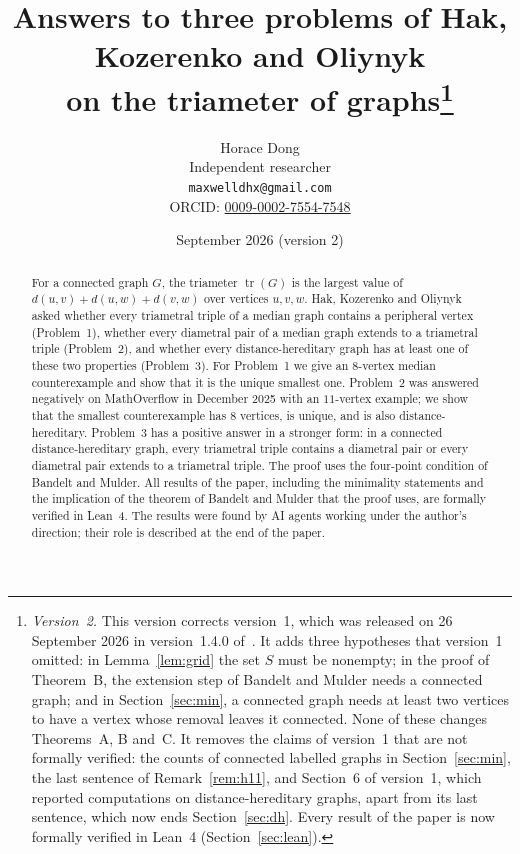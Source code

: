 \documentclass[11pt]{article}
\title{Answers to three problems of Hak, Kozerenko and Oliynyk\\ on the
triameter of graphs\thanks{\emph{Version~2.} This version corrects
version~1, which was released on 26 September 2026 in version~1.4.0
of~\cite{repo}. It adds three hypotheses that version~1 omitted: in
Lemma~\ref{lem:grid} the set $S$ must be nonempty; in the proof of
Theorem~B, the extension step of Bandelt and Mulder needs a connected graph;
and in Section~\ref{sec:min}, a connected graph needs at least two vertices to
have a vertex whose removal leaves it connected. None of these changes
Theorems~A, B and~C. It removes the claims of version~1 that are not formally
verified: the counts of connected labelled graphs in Section~\ref{sec:min},
the last sentence of Remark~\ref{rem:h11}, and Section~6 of version~1, which
reported computations on distance-hereditary graphs, apart from its last
sentence, which now ends Section~\ref{sec:dh}. Every result of the paper is
now formally verified in Lean~4 (Section~\ref{sec:lean}).}}
\author{Horace Dong\\ \small Independent researcher\\
\small\texttt{maxwelldhx@gmail.com}\\
\small ORCID: \href{https://orcid.org/0009-0002-7554-7548}{0009-0002-7554-7548}}
\date{September 2026 (version 2)}
\theoremstyle{remark}
\DeclareMathOperator{\tr}{tr}
\begin{document}
\maketitle
\begin{abstract}
For a connected graph $G$, the triameter $\tr(G)$ is the largest value of
$d(u,v)+d(u,w)+d(v,w)$ over vertices $u,v,w$. Hak, Kozerenko and Oliynyk asked
whether every triametral triple of a median graph contains a peripheral vertex
(Problem~1), whether every diametral pair of a median graph extends to a
triametral triple (Problem~2), and whether every distance-hereditary graph has
at least one of these two properties (Problem~3). For Problem~1 we give an
$8$-vertex median counterexample and show that it is the unique smallest
one. Problem~2 was answered negatively on MathOverflow in
December 2025 with an $11$-vertex example; we show that the smallest
counterexample has $8$ vertices, is unique, and is also distance-hereditary.
Problem~3 has a positive answer in a stronger form: in a connected
distance-hereditary graph, every triametral triple contains a diametral pair or
every diametral pair extends to a triametral triple. The proof uses the
four-point condition of Bandelt and Mulder.
All results of the paper, including the minimality statements and the
implication of the theorem of Bandelt and Mulder that the proof uses, are
formally verified in Lean~4. The results were found by AI agents working under the author's
direction; their role is described at the end of the paper.
\end{abstract}
\end{document}

